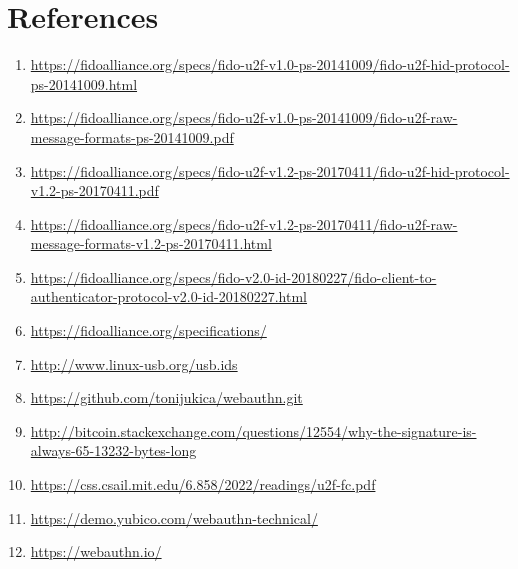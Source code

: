 \documentclass[acmtog,review]{acmart}
\begin{document}
\vspace{100px}
\newline
\vspace{10px}
\newline
\vspace{10px}
\newline
\vspace{10px}
\newline
\vspace{10px}
\newline
\vspace{10px}
\newline
\vspace{10px}
\newline
\vspace{10px}
\newline
\vspace{10px}
\newline

% 
% 

\section*{References}

\begin{enumerate}
    \item \url{https://fidoalliance.org/specs/fido-u2f-v1.0-ps-20141009/fido-u2f-hid-protocol-ps-20141009.html}
    \item \url{https://fidoalliance.org/specs/fido-u2f-v1.0-ps-20141009/fido-u2f-raw-message-formats-ps-20141009.pdf}
    \item \url{https://fidoalliance.org/specs/fido-u2f-v1.2-ps-20170411/fido-u2f-hid-protocol-v1.2-ps-20170411.pdf}
    \item \url{https://fidoalliance.org/specs/fido-u2f-v1.2-ps-20170411/fido-u2f-raw-message-formats-v1.2-ps-20170411.html}
    \item \url{https://fidoalliance.org/specs/fido-v2.0-id-20180227/fido-client-to-authenticator-protocol-v2.0-id-20180227.html}
    \item \url{https://fidoalliance.org/specifications/}
    \item \url{http://www.linux-usb.org/usb.ids}
    \item \url{https://github.com/tonijukica/webauthn.git}
    \item \url{http://bitcoin.stackexchange.com/questions/12554/why-the-signature-is-always-65-13232-bytes-long}
    \item \url{https://css.csail.mit.edu/6.858/2022/readings/u2f-fc.pdf}
    \item \url{https://demo.yubico.com/webauthn-technical/}
    \item \url{https://webauthn.io/}
\end{enumerate}
\end{document}
